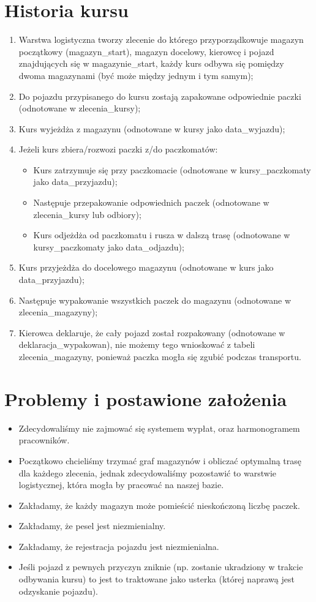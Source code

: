 \documentclass{article} %
\begin{document}
\section*{Historia kursu}
    \begin{enumerate}
        \item Warstwa logistyczna tworzy zlecenie do którego przyporządkowuje magazyn początkowy (magazyn\_start), magazyn docelowy, kierowcę i pojazd znajdujących się w magazynie\_start, każdy kurs odbywa się pomiędzy dwoma magazynami (być może między jednym i tym samym);
        \item Do pojazdu przypisanego do kursu zostają zapakowane odpowiednie paczki (odnotowane w zlecenia\_kursy);
        \item Kurs wyjeżdża z magazynu (odnotowane w kursy jako data\_wyjazdu);
        \item Jeżeli kurs zbiera/rozwozi paczki z/do paczkomatów:
            \begin{itemize}
                \item Kurs zatrzymuje się przy paczkomacie (odnotowane w kursy\_paczkomaty jako data\_przyjazdu);
                \item Następuje przepakowanie odpowiednich paczek (odnotowane w zlecenia\_kursy lub odbiory);
                \item Kurs odjeżdża od paczkomatu i rusza w dalszą trasę (odnotowane w kursy\_paczkomaty jako data\_odjazdu);
            \end{itemize}
        \item Kurs przyjeżdża do docelowego magazynu (odnotowane w kurs jako data\_przyjazdu);
        \item Następuje wypakowanie wszystkich paczek do magazynu (odnotowane w zlecenia\_magazyny);
        \item Kierowca deklaruje, że cały pojazd został rozpakowany (odnotowane w deklaracja\_wypakowan), nie możemy tego wnioskować z tabeli zlecenia\_magazyny, ponieważ paczka mogła się zgubić podczas transportu.
    \end{enumerate}
\section*{Problemy i postawione założenia}
	\begin{itemize}
	\item Zdecydowaliśmy nie zajmować się systemem wypłat, oraz harmonogramem pracowników.
	\item Początkowo chcieliśmy trzymać graf magazynów i obliczać optymalną trasę dla każdego zlecenia, jednak zdecydowaliśmy pozostawić to warstwie logistycznej, która mogła by pracować na naszej bazie.				
    \item Zakładamy, że każdy magazyn może pomieścić nieskończoną liczbę paczek.
    \item Zakładamy, że pesel jest niezmienialny.
	\item Zakładamy, że rejestracja pojazdu jest niezmienialna.
	\item Jeśli pojazd z pewnych przyczyn zniknie (np. zostanie ukradziony w trakcie odbywania kursu) to jest to traktowane jako usterka (której naprawą jest odzyskanie pojazdu). 
	\end{itemize}
\end{document}
